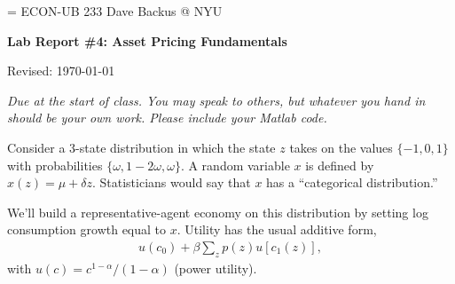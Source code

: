 \documentclass[11pt]{exam}
\begin{document}
\parskip=\bigskipamount
\parindent=0.0in
\thispagestyle{empty}
{\large ECON-UB 233 \hfill Dave Backus @ NYU}

\bigskip\bigskip
\centerline{\Large \bf Lab Report \#4: Asset Pricing Fundamentals}
\centerline{Revised: \today}

\bigskip
{\it Due at the start of class.
You may speak to others, but whatever you hand in should be your own work.
Please include your Matlab code.}

\begin{questions}
Consider a 3-state distribution in which the state $z$ takes on the values
$\{-1, 0, 1\}$ with
probabilities $\{\omega, 1-2\omega, \omega \}$.
A random variable $x$ is defined by $x(z) = \mu + \delta z$.
Statisticians would say that $x$ has a ``categorical distribution.''

We'll build a representative-agent economy on this distribution
by setting log consumption growth equal to $x$.
Utility has the usual additive form,
\begin{eqnarray*}
    u(c_0) + \beta \sum_z p(z) u[c_1(z)] ,
\end{eqnarray*}
with $u(c) = c^{1-\alpha}/(1-\alpha)$ (power utility).

\end{questions}
\end{document}
